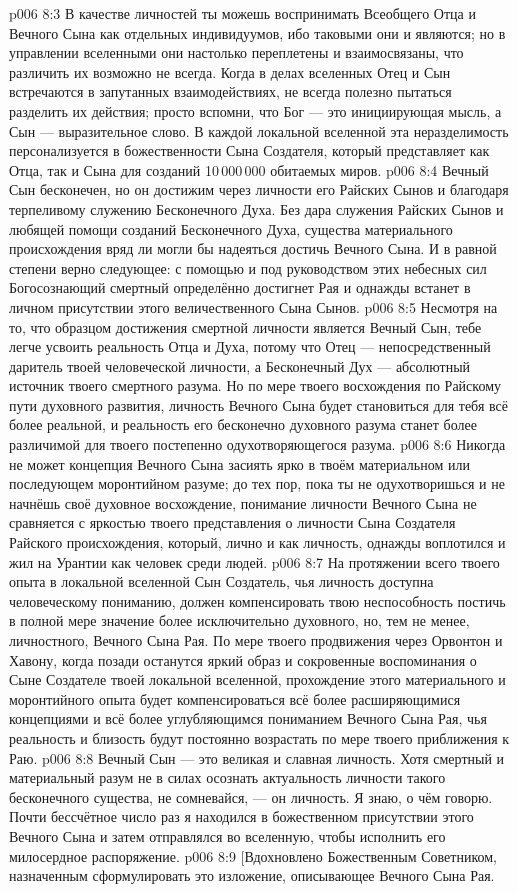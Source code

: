 \vs p006 8:3 В качестве личностей ты можешь воспринимать Всеобщего Отца и Вечного Сына как отдельных индивидуумов, ибо таковыми они и являются; но в управлении вселенными они настолько переплетены и взаимосвязаны, что различить их возможно не всегда. Когда в делах вселенных Отец и Сын встречаются в запутанных взаимодействиях, не всегда полезно пытаться разделить их действия; просто вспомни, что Бог --- это инициирующая мысль, а Сын --- выразительное слово. В каждой локальной вселенной эта неразделимость персонализуется в божественности Сына Создателя, который представляет как Отца, так и Сына для созданий 10\,000\,000 обитаемых миров.
\vs p006 8:4 Вечный Сын бесконечен, но он достижим через личности его Райских Сынов и благодаря терпеливому служению Бесконечного Духа. Без дара служения Райских Сынов и любящей помощи созданий Бесконечного Духа, существа материального происхождения вряд ли могли бы надеяться достичь Вечного Сына. И в равной степени верно следующее: с помощью и под руководством этих небесных сил Богосознающий смертный определённо достигнет Рая и однажды встанет в личном присутствии этого величественного Сына Сынов.
\vs p006 8:5 \pc Несмотря на то, что образцом достижения смертной личности является Вечный Сын, тебе легче усвоить реальность Отца и Духа, потому что Отец --- непосредственный даритель твоей человеческой личности, а Бесконечный Дух --- абсолютный источник твоего смертного разума. Но по мере твоего восхождения по Райскому пути духовного развития, личность Вечного Сына будет становиться для тебя всё более реальной, и реальность его бесконечно духовного разума станет более различимой для твоего постепенно одухотворяющегося разума.
\vs p006 8:6 Никогда не может концепция Вечного Сына засиять ярко в твоём материальном или последующем моронтийном разуме; до тех пор, пока ты не одухотворишься и не начнёшь своё духовное восхождение, понимание личности Вечного Сына не сравняется с яркостью твоего представления о личности Сына Создателя Райского происхождения, который, лично и как личность, однажды воплотился и жил на Урантии как человек среди людей.
\vs p006 8:7 На протяжении всего твоего опыта в локальной вселенной Сын Создатель, чья личность доступна человеческому пониманию, должен компенсировать твою неспособность постичь в полной мере значение более исключительно духовного, но, тем не менее, личностного, Вечного Сына Рая. По мере твоего продвижения через Орвонтон и Хавону, когда позади останутся яркий образ и сокровенные воспоминания о Сыне Создателе твоей локальной вселенной, прохождение этого материального и моронтийного опыта будет компенсироваться всё более расширяющимися концепциями и всё более углубляющимся пониманием Вечного Сына Рая, чья реальность и близость будут постоянно возрастать по мере твоего приближения к Раю.
\vs p006 8:8 \pc Вечный Сын --- это великая и славная личность. Хотя смертный и материальный разум не в силах осознать актуальность личности такого бесконечного существа, не сомневайся, --- он личность. Я знаю, о чём говорю. Почти бессчётное число раз я находился в божественном присутствии этого Вечного Сына и затем отправлялся во вселенную, чтобы исполнить его милосердное распоряжение.
\vsetoff
\vs p006 8:9 [Вдохновлено Божественным Советником, назначенным сформулировать это изложение, описывающее Вечного Сына Рая.
\quizlink
